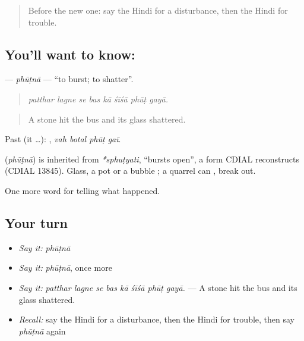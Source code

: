 \label{lesson:HI-C316-phutna}



\begin{quote}
Before the new one: say the Hindi for a disturbance, then the Hindi for trouble.
\end{quote}

\subsection*{You'll want to know: }
\textbf{} — \emph{phūṭnā} — \textquotedblleft{}to burst; to shatter\textquotedblright{}.

\begin{quote}
       
\end{quote}

\begin{quote}
\emph{patthar lagne se bas kā śīśā phūṭ gayā.}
\end{quote}

\begin{quote}
A stone hit the bus and its glass shattered.
\end{quote}

Past (it …):    , \emph{vah botal phūṭ gaī}.

\begin{cousinweb}
\textbf{} (\emph{phūṭnā}) is inherited from \emph{*sphuṭyati}, \textquotedblleft{}bursts open\textquotedblright{}, a form CDIAL reconstructs (CDIAL 13845). Glass, a pot or a bubble \textbf{ }; a quarrel can \textbf{ }, break out.
\end{cousinweb}

\begin{grammarlens}[title={What you've built}]
One more word for telling what happened.
\end{grammarlens}

\subsection*{Your turn}
\begin{itemize}
\raggedright
  \item \emph{Say it:} \emph{phūṭnā}
  \item \emph{Say it:} \emph{phūṭnā}, once more
  \item \emph{Say it:} \emph{patthar lagne se bas kā śīśā phūṭ gayā.} — A stone hit the bus and its glass shattered.
  \item \emph{Recall:} say the Hindi for a disturbance, then the Hindi for trouble, then say \emph{phūṭnā} again
\end{itemize}

